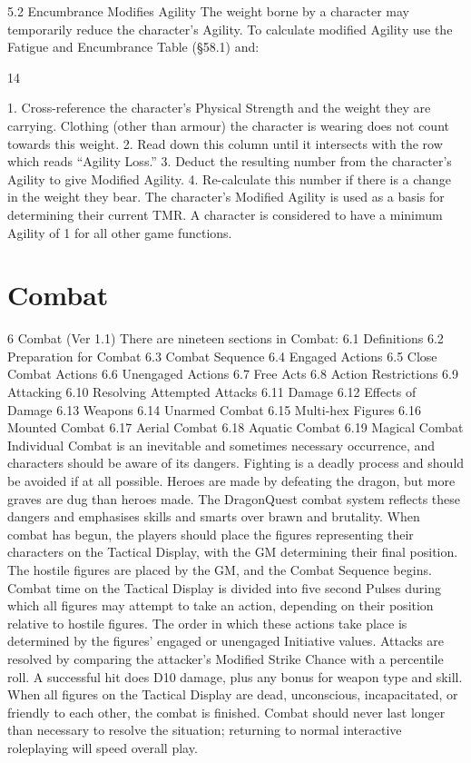 \documentclass[a4paper]{article}
\begin{document}
\begin{multicols}{3}
5.2 Encumbrance Modifies Agility
The weight borne by a character may temporarily
reduce the character’s Agility.
To calculate modified Agility use the Fatigue and
Encumbrance Table (§58.1) and:

14

1. Cross-reference the character’s Physical
Strength and the weight they are carrying. Clothing
(other than armour) the character is wearing does
not count towards this weight.
2. Read down this column until it intersects with
the row which reads “Agility Loss.”
3. Deduct the resulting number from the character’s Agility to give Modified Agility.
4. Re-calculate this number if there is a change in
the weight they bear.
The character’s Modified Agility is used as a basis
for determining their current TMR. A character is
considered to have a minimum Agility of 1 for all
other game functions.

\section{Combat}

6 Combat (Ver 1.1)
There are nineteen sections in Combat:
6.1
Definitions
6.2
Preparation for Combat
6.3
Combat Sequence
6.4
Engaged Actions
6.5
Close Combat Actions
6.6
Unengaged Actions
6.7
Free Acts
6.8
Action Restrictions
6.9
Attacking
6.10 Resolving Attempted Attacks
6.11 Damage
6.12 Effects of Damage
6.13 Weapons
6.14 Unarmed Combat
6.15 Multi-hex Figures
6.16 Mounted Combat
6.17 Aerial Combat
6.18 Aquatic Combat
6.19 Magical Combat
Individual Combat is an inevitable and sometimes
necessary occurrence, and characters should be
aware of its dangers. Fighting is a deadly process
and should be avoided if at all possible. Heroes are
made by defeating the dragon, but more graves are
dug than heroes made. The DragonQuest combat
system reflects these dangers and emphasises skills
and smarts over brawn and brutality.
When combat has begun, the players should place
the figures representing their characters on the
Tactical Display, with the GM determining their
final position. The hostile figures are placed by the
GM, and the Combat Sequence begins.
Combat time on the Tactical Display is divided
into five second Pulses during which all figures
may attempt to take an action, depending on their
position relative to hostile figures. The order in
which these actions take place is determined by the
figures’ engaged or unengaged Initiative values.
Attacks are resolved by comparing the attacker’s
Modified Strike Chance with a percentile roll. A
successful hit does D10 damage, plus any bonus
for weapon type and skill.
When all figures on the Tactical Display are dead,
unconscious, incapacitated, or friendly to each
other, the combat is finished. Combat should never
last longer than necessary to resolve the situation;
returning to normal interactive roleplaying will
speed overall play.


\end{multicols}
\end{document}
